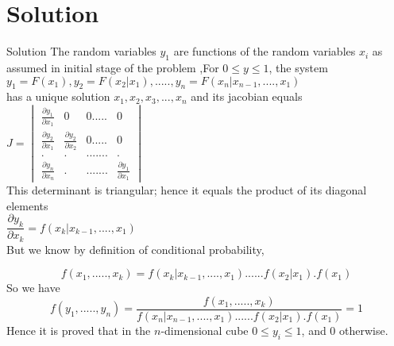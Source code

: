 \documentclass{beamer}
\begin{document}
	\section{Solution}
	\begin{frame}{Solution}
	The random variables $ y_{1} $ are functions of the random variables $ x_{i}$ as assumed in initial stage of the problem ,For $  0 \leq y \leq 1 $, the system  \\
	$ y_{1}=F(x_{1}) ,y_{2}=F(x_{2}|x_{1}), ..... , y_{n}=F(x_{n}|x_{n-1},....,x_1{})  $\\
	has a unique solution $ x_{1},x_{2},x_{3},...,x_{n} $ and its jacobian equals \\
	$ J= \begin{vmatrix} \frac{ {\partial } y_{1}}{{ \partial } x_{1}}& 0 &0 .....&0 \\ \frac{{ \partial } y_{2}}{{\partial}x_{1}} & \frac{{\partial}y_{2}}{{\partial}x_{2}} &0 .....&0 \\ .&.&.......&. \\ \frac{{\partial}y_{n}}{{\partial}x_{n}} & . &.. .....& \frac{{\partial}y_{1}}{{\partial}x_{1}} \end{vmatrix}  $\\
	This determinant is triangular; hence it equals the product of its diagonal elements \\
	$ \dfrac{{\partial } y_{k}}{{\partial}x_{k}}=f(x_{k}|x_{k-1},....,x_{1}) $\\
	But we know by definition of conditional probability,\\
	\end{frame}
\begin{frame}
 \begin{equation}
 	f(x_{1},.....,x_{k})=f(x_{k}|x_{k-1},....,x_{1})......f(x_{2}|x_{1}).f(x_{1})
 \end{equation}
 So we have \\
 \begin{equation}
 	f(y_{1},.....,y_{n})=\dfrac{f(x_{1},.....,x_{k})}{f(x_{n}|x_{n-1},....,x_{1})......f(x_{2}|x_{1}).f(x_{1})}=1
 \end{equation}
 Hence it is proved that in the $ n $-dimensional cube $  0 \leq y_{i} \leq 1 $, and 0 otherwise. 
\end{frame}
\end{document}
